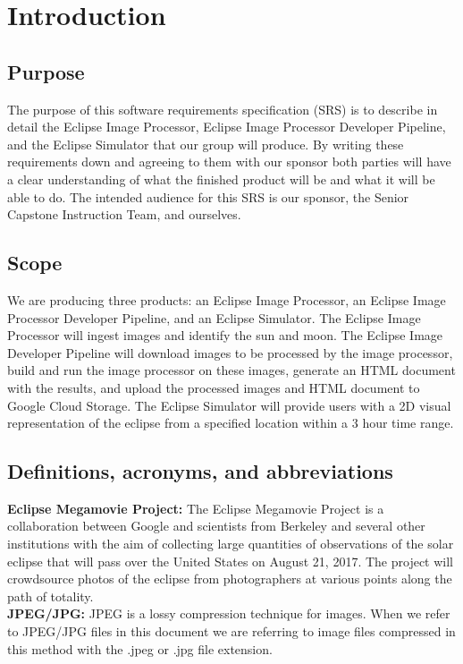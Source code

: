 \documentclass[10pt, onecolumn, draftclsnofoot, letterpaper, compsoc]{IEEEtran}
\begin{document}
\section{Introduction}

\subsection{Purpose}
The purpose of this software requirements specification (SRS) is to describe in
detail the Eclipse Image Processor, Eclipse Image Processor Developer Pipeline,
and the Eclipse Simulator that our group will
produce. By writing these requirements down and agreeing to them with our
sponsor both parties will have a clear understanding of what the finished
product will be and what it will be able to do. The intended audience for this
SRS is our sponsor, the Senior Capstone Instruction Team, and ourselves.

\subsection{Scope}
We are producing three products: an Eclipse Image Processor, an Eclipse
Image Processor Developer Pipeline, and an Eclipse
Simulator. The Eclipse Image Processor will ingest images and identify the sun
and moon.
The Eclipse Image Developer Pipeline
will download images to be processed by the image processor, build and run the
image processor on these images, generate an HTML document with the results,
and upload the processed images and HTML document to Google Cloud Storage. The Eclipse
Simulator will provide users with a 2D visual representation of the eclipse from a
specified location within a 3 hour time range.

\subsection{Definitions, acronyms, and abbreviations}

	\textbf{Eclipse Megamovie Project:}
	The Eclipse Megamovie Project is a collaboration between Google
	and scientists from Berkeley and several other institutions with the
	aim of collecting large quantities of observations of the solar eclipse
	that will pass over the United States on August 21, 2017. The project
	will crowdsource photos of the eclipse from photographers at various
	points along the path of totality. \\

	\noindent \textbf{JPEG/JPG:}
	JPEG is a lossy compression technique for images. When we refer
	to JPEG/JPG files in this document we are referring to image files
	compressed in this method with the .jpeg or .jpg file extension. \\
\end{document}
